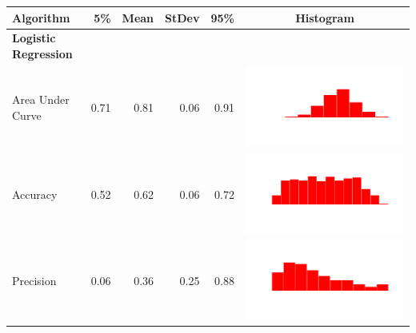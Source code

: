 \documentclass[conference]{IEEEtran}
\begin{document}
\begin{table}
  \begin{tabular}{lrrrrc}
    \hline
    \textbf{Algorithm} & \textbf{5\%} & \textbf{Mean} & \textbf{StDev} & \textbf{95\%} & \textbf{Histogram} \\
    \hline

    \bf{Logistic Regression}\\
    Area Under Curve & 0.71 & 0.81 & 0.06 & 0.91 & \includegraphics[scale = 0.1, clip = true, trim= 50px 60px 50px 60px]{../figs/hist-results/hist-LRauc.pdf} \\
    Accuracy & 0.52 & 0.62 & 0.06 & 0.72 & \includegraphics[scale = 0.1, clip = true, trim= 50px 60px 50px 60px]{../figs/hist-results/hist-LRacc.pdf} \\
    Precision & 0.06 & 0.36 & 0.25 & 0.88 & \includegraphics[scale = 0.1, clip = true, trim= 50px 60px 50px 60px]{../figs/hist-results/hist-LRprec.pdf} \\

\end{tabular}
\end{table}
\end{document}
